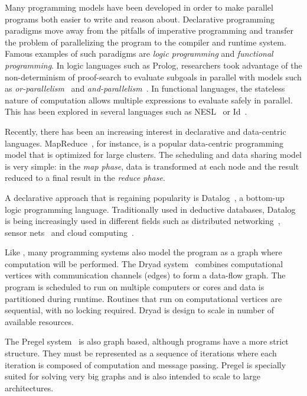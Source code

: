 
Many programming models have been developed in order to make parallel programs both easier to write and reason about. 
Declarative programming paradigms move away from the pitfalls of imperative programming and transfer the problem of parallelizing
the program to the compiler and runtime system. Famous examples of such paradigms are \emph{logic programming} and \emph{functional programming}.
In logic languages such as Prolog, researchers took advantage of the non-determinism of proof-search to evaluate subgoals
in parallel with models such as \emph{or-parallelism}~\cite{ali-86} and \emph{and-parallelism}~\cite{Shen-92}.
In functional languages, the stateless nature of computation allows multiple expressions to evaluate safely in parallel.
This has been explored in several languages such as NESL~\cite{Blelloch:1996:PPA:227234.227246} or Id~\cite{Nikhil93anoverview}.

Recently, there has been an increasing interest in declarative and data-centric languages.
MapReduce~\cite{Dean:2008:MSD:1327452.1327492}, for instance, is a popular data-centric programming
model that is optimized for large clusters. The scheduling and data sharing model is very simple:
in the \emph{map phase}, data is transformed at each node and the result reduced to a final
result in the \emph{reduce phase}.

A declarative approach that is regaining popularity is Datalog~\cite{Ullman:1990:PDK:533142}, a
bottom-up logic programming language.
Traditionally used in deductive databases, Datalog is being increasingly used in different fields
such as distributed networking~\cite{Loo-condie-garofalakis-p2}, sensor
nets~\cite{Chu:2007:DID:1322263.1322281} and cloud computing~\cite{alvaro:boom}.

Like \lang, many programming systems also model the program as a graph where computation will be performed.
The Dryad system~\cite{Isard:2007:DDD:1272996.1273005} combines computational vertices
with communication channels (edges) to form a data-flow graph. The program is scheduled to
run on multiple computers or cores and data is partitioned during runtime. Routines that run on computational vertices
are sequential, with no locking required. Dryad is design to scale in number of available resources.

The Pregel system~\cite{Malewicz:2010:PSL:1807167.1807184} is also graph based, although programs have a more strict
structure. They must be represented as a sequence of iterations where each iteration is composed of computation and message passing.
Pregel is specially suited for solving very big graphs
and is also intended to scale to large architectures.

